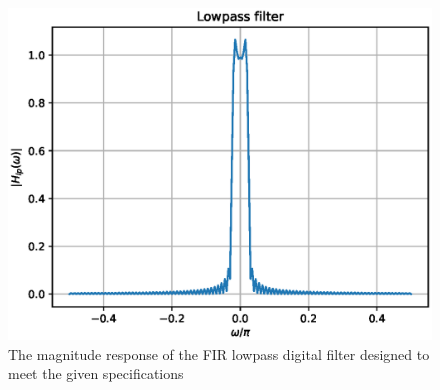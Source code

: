 \documentclass{article}
\begin{document}
\begin{figure}
\label{fig5}
\includegraphics[width = 15cm]{figs/fir/ee18btech11029_lowpass.eps}
\caption{The magnitude response of the FIR lowpass digital filter designed to meet the given specifications} 
\end{figure}
\end{document}
